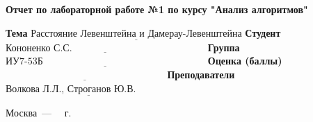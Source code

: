 \begin{titlepage}
	
	\begin{center}
		\Large\textbf{Отчет по лабораторной работе №1 по курсу "Анализ алгоритмов"}\newline
	\end{center}
	
	\noindent\textbf{Тема} $\underline{\text{Расстояние Левенштейна и Дамерау-Левенштейна}}$\newline\newline\newline
	\noindent\textbf{Студент} $\underline{\text{Кононенко С.С.~~~~~~~~~~~~~~~~~~~~~~~~~~~~~~~~~~~~~~~~~}}$\newline\newline
	\noindent\textbf{Группа} $\underline{\text{ИУ7-53Б~~~~~~~~~~~~~~~~~~~~~~~~~~~~~~~~~~~~~~~~~~~~~~~~~~}}$\newline\newline
	\noindent\textbf{Оценка (баллы)} $\underline{\text{~~~~~~~~~~~~~~~~~~~~~~~~~~~~~~~~~~~~~~~~~~~~~~~~~}}$\newline\newline
	\noindent\textbf{Преподаватели} $\underline{\text{Волкова Л.Л., Строганов Ю.В.~~~~~~~~~~~}}$\newline
	
	\begin{center}
		\vfill
		Москва~---~\the\year
		~г.
	\end{center}
 \restoregeometry
\end{titlepage}
